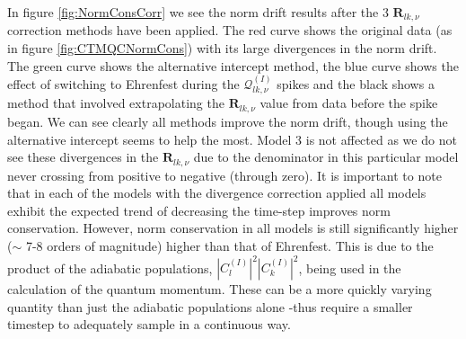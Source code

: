 In figure \ref{fig:NormConsCorr} we see the norm drift results after the 3 $\mathbf{R}_{lk, \nu}$ correction methods have been applied. The red curve shows the original data (as in figure \ref{fig:CTMQCNormCons}) with its large divergences in the norm drift. The green curve shows the alternative intercept method, the blue curve shows the effect of switching to Ehrenfest during the $\mathcal{Q}_{lk, \nu}^{(I)}$ spikes and the black shows a method that involved extrapolating the $\mathbf{R}_{lk, \nu}$ value from data before the spike began. We can see clearly all  methods improve the norm drift, though using the alternative intercept seems to help the most. Model 3 is not affected as we do not see these divergences in the $\mathbf{R}_{lk, \nu}$ due to the denominator in this particular model never crossing from positive to negative (through zero). It is important to note that in each of the models with the divergence correction applied all models exhibit the expected trend of decreasing the time-step improves norm conservation. However, norm conservation in all  models is still significantly higher ($\sim$ 7-8 orders of magnitude) higher than that of Ehrenfest.  This is due to the product of the adiabatic populations, $|C_{l}^{(I)}|^2 |C_{k}^{(I)}|^2$, being used in the calculation of the quantum momentum. These can be a more quickly varying quantity than just the adiabatic populations alone -thus require a smaller timestep to adequately sample in a continuous way.

